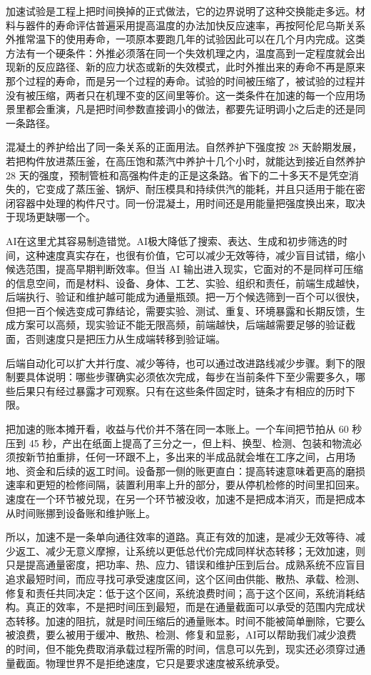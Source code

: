 加速试验是工程上把时间换掉的正式做法，它的边界说明了这种交换能走多远。材料与器件的寿命评估普遍采用提高温度的办法加快反应速率，再按阿伦尼乌斯关系外推常温下的使用寿命，一项原本要跑几年的试验因此可以在几个月内完成。这类方法有一个硬条件：外推必须落在同一个失效机理之内，温度高到一定程度就会出现新的反应路径、新的应力状态或新的失效模式，此时外推出来的寿命不再是原来那个过程的寿命，而是另一个过程的寿命。试验的时间被压缩了，被试验的过程并没有被压缩，两者只在机理不变的区间里等价。这一类条件在加速的每一个应用场景里都会重演，凡是把时间参数直接调小的做法，都要先证明调小之后走的还是同一条路径。

混凝土的养护给出了同一条关系的正面用法。自然养护下强度按 28 天龄期发展，若把构件放进蒸压釜，在高压饱和蒸汽中养护十几个小时，就能达到接近自然养护 28 天的强度，预制管桩和高强构件走的正是这条路。省下的二十多天不是凭空消失的，它变成了蒸压釜、锅炉、耐压模具和持续供汽的能耗，并且只适用于能在密闭容器中处理的构件尺寸。同一份混凝土，用时间还是用能量把强度换出来，取决于现场更缺哪一个。

AI在这里尤其容易制造错觉。AI极大降低了搜索、表达、生成和初步筛选的时间，这种速度真实存在，也很有价值，它可以减少无效等待，减少盲目试错，缩小候选范围，提高早期判断效率。但当 AI 输出进入现实，它面对的不是同样可压缩的信息空间，而是材料、设备、身体、工艺、实验、组织和责任，前端生成越快，后端执行、验证和维护越可能成为通量瓶颈。把一万个候选筛到一百个可以很快，但把一百个候选变成可靠结论，需要实验、测试、重复、环境暴露和长期反馈，生成方案可以高频，现实验证不能无限高频，前端越快，后端越需要足够的验证截面，否则速度只是把压力从生成端转移到验证端。

后端自动化可以扩大并行度、减少等待，也可以通过改进路线减少步骤。剩下的限制要具体说明：哪些步骤确实必须依次完成，每步在当前条件下至少需要多久，哪些后果只有经过暴露才可观察。只有在这些条件固定时，链条才有相应的历时下限。

把加速的账本摊开看，收益与代价并不落在同一本账上。一个车间把节拍从 60 秒压到 45 秒，产出在纸面上提高了三分之一，但上料、换型、检测、包装和物流必须按新节拍重排，任何一环跟不上，多出来的半成品就会堆在工序之间，占用场地、资金和后续的返工时间。设备那一侧的账更直白：提高转速意味着更高的磨损速率和更短的检修间隔，装置利用率上升的部分，要从停机检修的时间里扣回来。速度在一个环节被兑现，在另一个环节被没收，加速不是把成本消灭，而是把成本从时间账挪到设备账和维护账上。

所以，加速不是一条单向通往效率的道路。真正有效的加速，是减少无效等待、减少返工、减少无意义摩擦，让系统以更低总代价完成同样状态转移；无效加速，则只是提高通量密度，把功率、热、应力、错误和维护压到后台。成熟系统不应盲目追求最短时间，而应寻找可承受速度区间，这个区间由供能、散热、承载、检测、修复和责任共同决定：低于这个区间，系统浪费时间；高于这个区间，系统消耗结构。真正的效率，不是把时间压到最短，而是在通量截面可以承受的范围内完成状态转移。加速的阻抗，就是时间压缩后的通量账本。时间不能被简单删除，它要么被浪费，要么被用于缓冲、散热、检测、修复和显影，AI可以帮助我们减少浪费的时间，但不能免费取消承载过程所需的时间，信息可以先到，现实还必须穿过通量截面。物理世界不是拒绝速度，它只是要求速度被系统承受。

